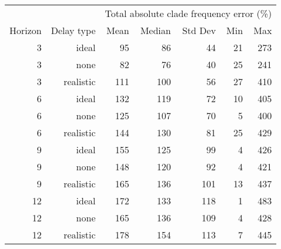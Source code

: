 
\begin{tabular*}{0.7\textwidth}{rrrrrrr}
\toprule
        &            & \multicolumn{5}{c}{Total absolute clade frequency error (\%)} \\
Horizon & Delay type & Mean & Median & Std Dev & Min & Max \\
\midrule

3 & ideal & 95 & 86 & 44 & 21 & 273 \\
3 & none & 82 & 76 & 40 & 25 & 241 \\
3 & realistic & 111 & 100 & 56 & 27 & 410 \\
6 & ideal & 132 & 119 & 72 & 10 & 405 \\
6 & none & 125 & 107 & 70 & 5 & 400 \\
6 & realistic & 144 & 130 & 81 & 25 & 429 \\
9 & ideal & 155 & 125 & 99 & 4 & 426 \\
9 & none & 148 & 120 & 92 & 4 & 421 \\
9 & realistic & 165 & 136 & 101 & 13 & 437 \\
12 & ideal & 172 & 133 & 118 & 1 & 483 \\
12 & none & 165 & 136 & 109 & 4 & 428 \\
12 & realistic & 178 & 154 & 113 & 7 & 445 \\

\bottomrule
\end{tabular*}

